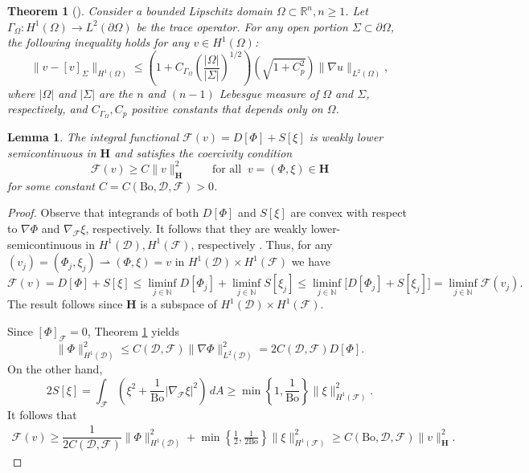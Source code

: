 \documentclass[letterpaper, 12pt]{amsart}
\newtheorem{theorem}[definition]{Theorem}
\newtheorem{lemma}[definition]{Lemma}
\newcommand{\bond}{\mathrm{Bo}}
\newcommand{\R}{\mathbb{R}}
\newcommand{\N}{\mathbb{N}}
\renewcommand{\H}{\mathbf{H}}
\newcommand{\D}{\mathcal{D}}
\newcommand{\F}{\mathcal{F}}
\newcommand{\FF}{\mathscr{F}}
\begin{document}
\begin{theorem}[{\cite[Example 3.6]{Alessandrini:2008aa}}]\label{thm:CoV_Poincare_Wirtinger}
Consider a bounded Lipschitz domain $\Omega\subset\R^n, n\ge 1$. Let $\Gamma_\Omega\colon H^1(\Omega)\longrightarrow L^2(\partial\Omega)$ be the trace operator. For any open portion $\Sigma\subset\partial\Omega$, the following inequality holds for any $v\in H^1(\Omega)$:
\[ \|v - [v]_\Sigma\|_{H^1(\Omega)}\le \left(1+C_{\Gamma_\Omega}\left(\dfrac{|\Omega|}{|\Sigma|}\right)^{1/2}\right)\left(\sqrt{1+C_p^2}\right)\|\nabla u\|_{L^2(\Omega)}, \]
where $|\Omega|$ and $|\Sigma|$ are the $n$ and $(n-1)$ Lebesgue measure of $\Omega$ and $\Sigma$, respectively, and $C_{\Gamma_\Omega}, C_p$ positive constants that depends only on $\Omega$.
\end{theorem}


\begin{lemma}\label{thm:CoV_Coercivity}
The integral functional $\FF(v)=D[\Phi] + S[\xi]$  is weakly lower semicontinuous in $\H$ and satisfies the coercivity condition
\[ \FF(v)\ge C\|v\|_\H^2 \qquad \textrm{ for all  }  \ v=(\Phi,\xi)\in\H  \]
for some constant $C=C(\bond,\D,\F)>0$.
\end{lemma}
\begin{proof}
Observe that integrands of both $D[\Phi]$ and $S[\xi]$ are convex with respect to $\nabla\Phi$ and $\nabla_{\F}\xi$, respectively. It follows that they are weakly lower-semicontinuous in $H^1(\D), H^1(\F)$, respectively \cite[Theorem 2.12]{Rindler:2015aa}. Thus, for any $(v_j)=(\Phi_j,\xi_j)\rightharpoonup (\Phi,\xi) = v$ in $H^1(\D)\times H^1(\F)$ we have
\[ \FF(v) = D[\Phi] + S[\xi] \le \liminf_{j\in\N} D[\Phi_j] + \liminf_{j\in\N} S[\xi_j] \le \liminf_{j\in\N} \Big[D[\Phi_j] + S[\xi_j]\Big] = \liminf_{j\in\N} \FF(v_j). \]
The result follows since $\H$ is a subspace of $H^1(\D)\times H^1(\F)$.


Since $[\Phi]_\F=0$, Theorem \ref{thm:CoV_Poincare_Wirtinger} yields
\[ \|\Phi\|_{H^1(\D)}^2\le C(\D,\F)\|\nabla\Phi\|_{L^2(\D)}^2 =  2C(\D,\F)D[\Phi]. \]
On the other hand,
\[ 2S[\xi] = \int_{\F} \left(\xi^2 + \frac{1}{\bond}|\nabla_\F\xi|^2\right)\, dA \ge \min\left\{1,\frac{1}{\bond}\right\}\|\xi\|_{H^1(\F)}^2. \]
It follows that
\begin{align*}
\FF(v)  \ge \dfrac{1}{2C(\D,\F)}\|\Phi\|_{H^1(\D)}^2 + \min\left\{\frac{1}{2},\frac{1}{2\bond}\right\}\|\xi\|_{H^1(\F)}^2  
\geq C(\bond, \D, \F)\|v\|_\H^2.
\end{align*}
\end{proof}
\end{document}
